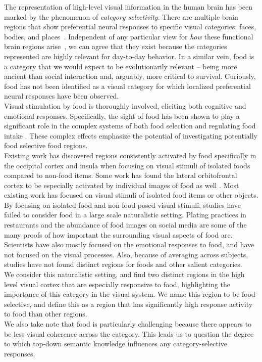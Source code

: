 \documentclass[../thesis.tex]{subfiles}
\begin{document}
The representation of high-level visual information in the human brain has been marked by the phenomenon of \textit{category selectivity}. There are multiple brain regions that show preferential neural responses to specific visual categories: faces, bodies, and places~\cite{Sergent1992,Kanwisher1997,Epstein1998,Downing2001}. Independent of any particular view for \textit{how} these functional brain regions arise~\cite{Kanwisher2000,Tarr2000}, we can agree that they exist because the categories represented are highly relevant for day-to-day behavior. In a similar vein, food is a category that we would expect to be evolutionarily relevant -- being more ancient than social interaction and, arguably, more critical to survival. Curiously, food has not been identified as a visual category for which localized preferential neural responses have been observed. \\

Visual stimulation by food is thoroughly involved, eliciting both cognitive and emotional responses\cite{ouwehand2010eat}. Specifically, the sight of food has been shown to play a significant role in the complex systems of both food selection and regulating food intake \cite{VanderLaan, van2006evolved}. These complex effects emphasize the potential of investigating potentially food selective food regions. \\

Existing work has discovered regions consistently activated by food specifically in the occipital cortex and insula when focusing on visual stimuli of isolated foods compared to non-food items. Some work has found the lateral orbitofrontal cortex to be especially activated by individual images of food as well \cite{VanderLaan}. Most existing work has focused on visual stimuli of isolated food items or other objects. \\

By focusing on isolated food and non-food posed visual stimuli, studies have failed to consider food in a large scale naturalistic setting. Plating practices in restaurants and the abundance of food images on social media are some of the many proofs of how important the surrounding visual aspects of food are. Scientists have also mostly focused on the emotional responses to food, and have not focused on the visual processes. Also, because of averaging across subjects, studies have not found distinct regions for foods and other salient categories. \\

We consider this naturalistic setting, and find two distinct regions in the high level visual cortex that are especially responsive to food, highlighting the importance of this category in the visual system. We name this region to be food-selective, and define this as a region that has significantly high response activity to food than other regions. \\

We also take note that food is particularly challenging because there appears to be less visual coherence across the category. This leads us to question the degree to which top-down semantic knowledge influences any category-selective responses. 
\end{document}
